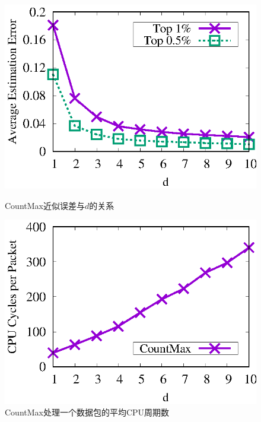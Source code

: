 \begin{figure}[!h]
	\centering
	\begin{minipage}[t]{0.48\linewidth}		
		\centering
		\includegraphics[width=\linewidth]{fig/cm_d_err.eps}
		\caption{\textnormal{CountMax近似误差与$d$的关系}}
		\label{fig:cm,d,acc}
	\end{minipage}\vspace{-0.6em}
\hspace{0.4em}
	\begin{minipage}[t]{0.48\linewidth}
        \centering
		\includegraphics[width=\linewidth]{fig/cm_d_cpu.eps}
		\caption{\textnormal{CountMax处理一个数据包的平均CPU周期数}}
		\label{fig:cm,d,cpu}
	\end{minipage}\vspace{-0.6em}
\hspace{0.1em}
\end{figure}

